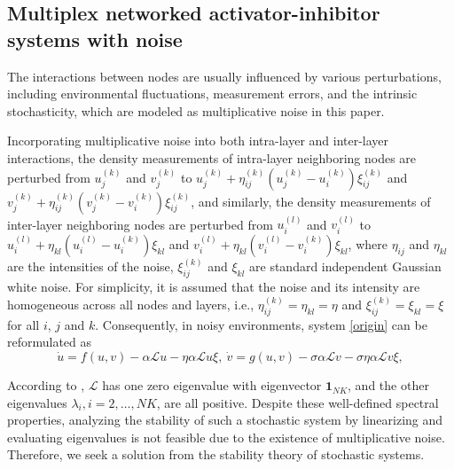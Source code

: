 \documentclass{SCIS2026}
\newcommand{\kk}{^{(k)}}
\newcommand{\ml}{\mathcal{L}}
\begin{document}
\label{topology}

\subsection{Multiplex networked activator-inhibitor systems with noise}

The interactions between nodes are usually influenced by various perturbations, including environmental fluctuations, measurement errors, and the intrinsic stochasticity, which are modeled as multiplicative noise in this paper.

Incorporating multiplicative noise into both intra-layer and inter-layer interactions, the density measurements of intra-layer neighboring nodes are perturbed from $u_j\kk$ and $v_j\kk$ to $u_j\kk + \eta_{ij}\kk (u_j\kk - u_i\kk)\xi_{ij}\kk$ and $v_j\kk + \eta_{ij}\kk (v_j\kk - v_i\kk)\xi_{ij}\kk$, and similarly, the density measurements of inter-layer neighboring nodes are perturbed from $u_i^{(l)}$ and $v_i^{(l)}$ to $u_i^{(l)} + \eta_{kl} (u_i^{(l)} - u_i\kk)\xi_{kl}$ and $v_i^{(l)} + \eta_{kl} (v_i^{(l)} - v_i\kk)\xi_{kl}$, where $\eta_{ij}$ and $\eta_{kl}$ are the intensities of the noise, $\xi_{ij}\kk$ and $\xi_{kl}$ are standard independent Gaussian white noise.
For simplicity, it is assumed that the noise and its intensity are homogeneous across all nodes and layers, i.e., $\eta_{ij}\kk = \eta_{kl} = \eta$ and $\xi_{ij}\kk = \xi_{kl} = \xi$ for all $i$, $j$ and $k$.
Consequently, in noisy environments, system \eqref{origin} can be reformulated as
\begin{equation}\label{noise}
	\dot{u} = f(u,v) - \alpha \ml u - \eta \alpha \ml u \xi, ~ \dot{v} = g(u,v) - \sigma \alpha \ml v - \sigma \eta \alpha \ml v \xi,
\end{equation}

According to \cite{Sole2013}, $\ml$ has one zero eigenvalue with eigenvector $\mathbf 1_{NK}$, and the other eigenvalues $\lambda_i, i = 2, \ldots, NK$, are all positive.
Despite these well-defined spectral properties, analyzing the stability of such a stochastic system by linearizing and evaluating eigenvalues is not feasible due to the existence of multiplicative noise.
Therefore, we seek a solution from the stability theory of stochastic systems.
\end{document}
